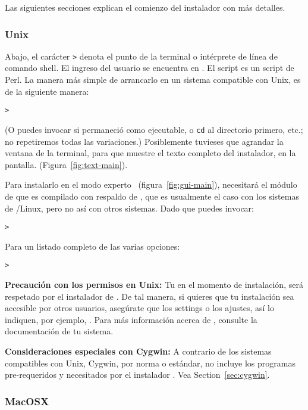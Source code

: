 \documentclass{article}
\begin{document}
\noindent
Las siguientes secciones explican el comienzo del instalador con más
detalles.

\subsubsection{Unix}

Abajo, el carácter \texttt{>} denota el punto de la terminal o
intérprete de línea de comando shell. El ingreso del usuario
se encuentra en .  El script
 es un script de Perl. La manera más
simple de arrancarlo en un sistema compatible con Unix, es
de la siguiente manera: \begin{alltt} >  \end{alltt} (O puedes
	invocar  si
	permaneció como ejecutable, o \texttt{cd} al
	directorio primero, etc.; no repetiremos todas las
	variaciones.) Posiblemente tuvieses que agrandar la
	ventana de la terminal, para que muestre el texto
	completo del instalador, en la pantalla.
	(Figura~\ref{fig:text-main}).

Para instalarlo en el modo experto \GUI\ (figura~\ref{fig:gui-main}),
necesitará el módulo de  que es compilado con
respaldo de , que es usualmente el caso con los sistemas de
\GNU/Linux, pero no así con otros sistemas. Dado que puedes invocar:
\begin{alltt}
> 
\end{alltt}

Para un listado completo de las varias opciones:
\begin{alltt}
> 
\end{alltt}

\textbf{Precaución con los permisos en Unix:} Tu  en el
momento de instalación, será respetado por el instalador de \TL{}. De
tal manera, si quieres que tu instalación sea accesible por otros
usuarios, asegúrate que los settings o los ajustes, así lo
indiquen, por ejemplo, . Para más
información acerca de 
, consulte la documentación de tu sistema. 

\textbf{Consideraciones especiales con Cygwin:} A contrario de los
sistemas compatibles con Unix, Cygwin, por norma o estándar, no
incluye los programas pre-requeridos y necesitados por el instalador
\TL{}. Vea Section~\ref{sec:cygwin}.

\subsubsection{MacOSX}
\label{sec:macosx}
\end{document}
